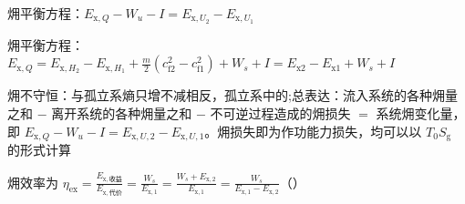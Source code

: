 㶲平衡方程：$E_{\mathrm{x},Q}-W_u - I =E_{\mathrm{x},U_2}-E_{\mathrm{x},U_1}$

㶲平衡方程：$E_{\mathrm{x},Q}= E_{\mathrm{x},H_2} - E_{\mathrm{x},H_1}+ \frac{m}{2}\left(c_{\mathrm{f}2}^2 - c_{\mathrm{f}1}^2\right)+ W_s + I= E_{\mathrm{x}2} - E_{\mathrm{x}1} + W_s + I$

\divider

㶲不守恒：与孤立系熵只增不减相反，孤立系中的;总表达：流入系统的各种㶲量之和 $-$ 离开系统的各种㶲量之和 $-$ 不可逆过程造成的㶲损失 $=$ 系统㶲变化量，即 $E_{\mathrm{x},Q}-W_u-I=E_{\mathrm{x},U,2}-E_{\mathrm{x},U,1}$。㶲损失即为作功能力损失，均可以以 $T_0S_\mathrm{g}$ 的形式计算

㶲效率为 $\eta_{\mathrm{ex}}=\frac{E_{\mathrm{x},\mathrm{收益}}}{E_{\mathrm{x},\mathrm{代价}}}=\frac{W_s}{E_{\mathrm{x},1}}=\frac{W_s+E_{\mathrm{x},2}}{E_{\mathrm{x},1}}=\frac{W_s}{E_{\mathrm{x},1}-E_{\mathrm{x},2}}$（）

\divider
